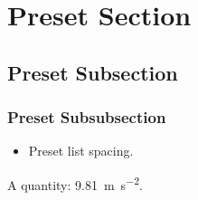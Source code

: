 \documentclass{article}
\begin{document}
\section{Preset Section}
\subsection{Preset Subsection}
\subsubsection{Preset Subsubsection}
\begin{itemize}\item Preset list spacing.\end{itemize}
A quantity: \SI{9.81}{\metre\per\second\squared}.
\end{document}
